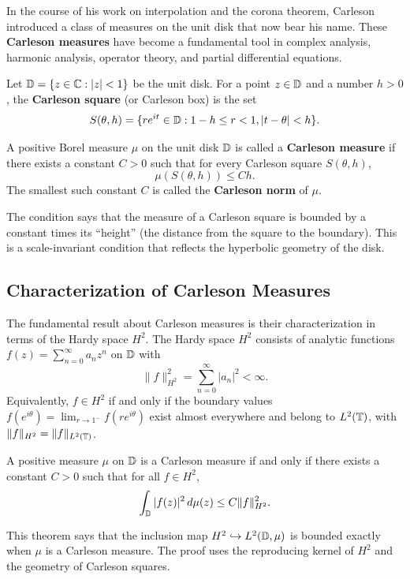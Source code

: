 In the course of his work on interpolation and the corona theorem, Carleson introduced a class of measures on the unit disk that now bear his name. These \textbf{Carleson measures} have become a fundamental tool in complex analysis, harmonic analysis, operator theory, and partial differential equations.

Let \(\mathbb{D} = \{z \in \mathbb{C} : |z| < 1\}\) be the unit disk. For a point \(z \in \mathbb{D}\) and a number \(h > 0\), the \textbf{Carleson square} (or Carleson box) is the set
\[
S(\theta, h) = \{re^{it} \in \mathbb{D} : 1-h \leq r < 1, |t-\theta| < h\}.
\]

\begin{definition}
A positive Borel measure \(\mu\) on the unit disk \(\mathbb{D}\) is called a \textbf{Carleson measure} if there exists a constant \(C > 0\) such that for every Carleson square \(S(\theta, h)\),
\[
\mu(S(\theta, h)) \leq C h.
\]
The smallest such constant \(C\) is called the \textbf{Carleson norm} of \(\mu\).
\end{definition}

The condition says that the measure of a Carleson square is bounded by a constant times its ``height'' (the distance from the square to the boundary). This is a scale-invariant condition that reflects the hyperbolic geometry of the disk.

\subsection{Characterization of Carleson Measures}

The fundamental result about Carleson measures is their characterization in terms of the Hardy space \(H^2\). The Hardy space \(H^2\) consists of analytic functions \(f(z) = \sum_{n=0}^\infty a_n z^n\) on \(\mathbb{D}\) with
\[
\|f\|_{H^2}^2 = \sum_{n=0}^\infty |a_n|^2 < \infty.
\]
Equivalently, \(f \in H^2\) if and only if the boundary values \(f(e^{i\theta}) = \lim_{r \to 1^-} f(re^{i\theta})\) exist almost everywhere and belong to \(L^2(\mathbb{T})\), with \(\|f\|_{H^2} = \|f\|_{L^2(\mathbb{T})}\).

\begin{theorem}
A positive measure \(\mu\) on \(\mathbb{D}\) is a Carleson measure if and only if there exists a constant \(C > 0\) such that for all \(f \in H^2\),
\[
\int_{\mathbb{D}} |f(z)|^2 \,d\mu(z) \leq C \|f\|_{H^2}^2.
\]
\end{theorem}

This theorem says that the inclusion map \(H^2 \hookrightarrow L^2(\mathbb{D}, \mu)\) is bounded exactly when \(\mu\) is a Carleson measure. The proof uses the reproducing kernel of \(H^2\) and the geometry of Carleson squares.

